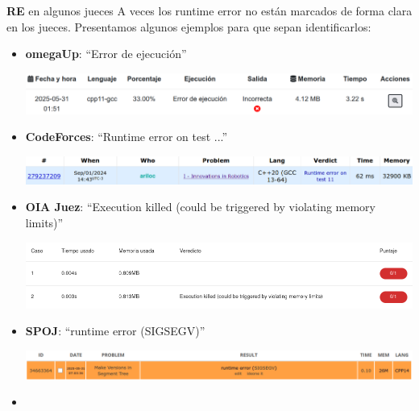 \documentclass{beamer}
\begin{document}
    \begin{frame}{\textbf{RE} en algunos jueces}
        A veces los runtime error no están marcados de forma clara en los jueces. Presentamos algunos ejemplos para que sepan identificarlos:\pause
        \setlength{\leftmargini}{16pt}
        \begin{itemize}
            \item \textbf{omegaUp}: ``Error de ejecución''
            \begin{center}
                \includegraphics[width=.8\linewidth]{./res/ou_rte.png}
            \end{center}

            \item \textbf{CodeForces}: ``Runtime error on test ...''
            \begin{center}
                \includegraphics[width=.8\linewidth]{./res/cf_rte.png}
            \end{center}
            
            \item \textbf{OIA Juez}: ``Execution killed (could be triggered by violating memory limits)''
            \begin{center}
                \includegraphics[width=.8\linewidth]{./res/oiaj_rte.png}
            \end{center}

            \item \textbf{SPOJ}: ``runtime error (SIGSEGV)''
            \begin{center}
                \includegraphics[width=.8\linewidth]{./res/spoj_rte.png}
            \end{center}
        \item 
        \end{itemize}
    \end{frame}
\end{document}
